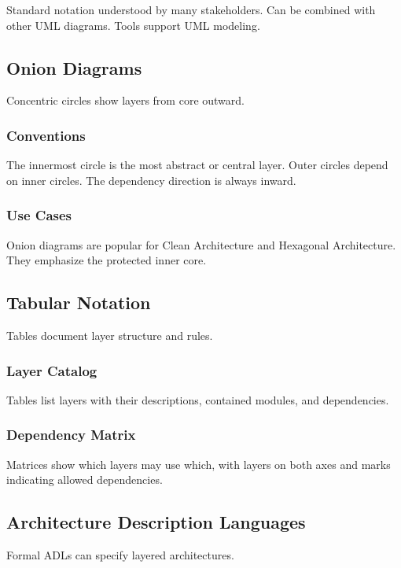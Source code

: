 \documentclass[11pt]{article}
\begin{document}
Standard notation understood by many stakeholders. Can be combined with other UML diagrams. Tools support UML modeling.

\subsection{Onion Diagrams}

Concentric circles show layers from core outward.

\subsubsection{Conventions}

The innermost circle is the most abstract or central layer. Outer circles depend on inner circles. The dependency direction is always inward.

\subsubsection{Use Cases}

Onion diagrams are popular for Clean Architecture and Hexagonal Architecture. They emphasize the protected inner core.

\subsection{Tabular Notation}

Tables document layer structure and rules.

\subsubsection{Layer Catalog}

Tables list layers with their descriptions, contained modules, and dependencies.

\subsubsection{Dependency Matrix}

Matrices show which layers may use which, with layers on both axes and marks indicating allowed dependencies.

\subsection{Architecture Description Languages}

Formal ADLs can specify layered architectures.
\end{document}
